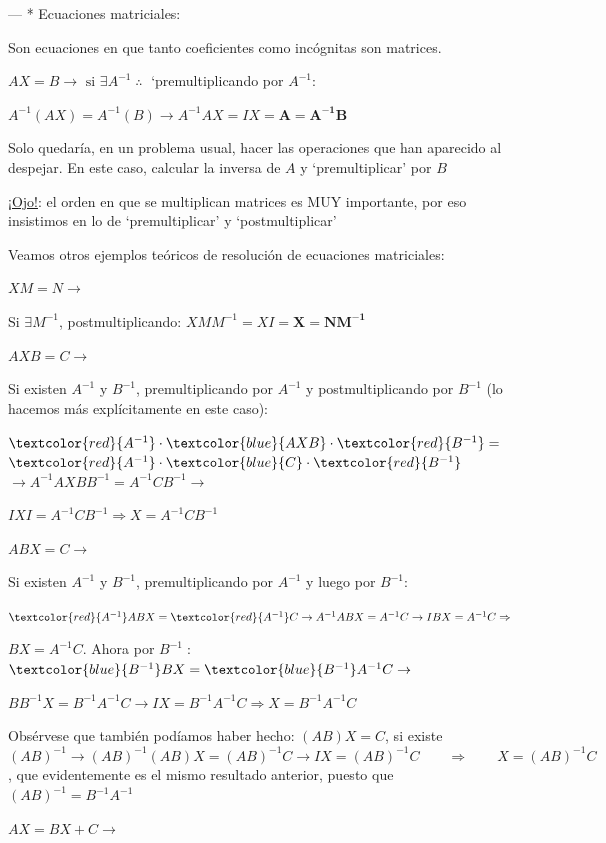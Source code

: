 --- * Ecuaciones matriciales: 

Son ecuaciones en que tanto coeficientes como incógnitas son matrices.

$AX=B \to \text{ si } \exists A^{-1} \; \therefore \; $ `premultiplicando por $A^{-1}$:

$A^{-1}(AX)= A^{-1}(B) \to A^{-1}AX=IX=\boldsymbol{A=A^{-1}B}$

Solo quedaría, en un problema usual, hacer las operaciones que han aparecido al despejar. En este caso, calcular la inversa de $A$ y `premultiplicar' por $B$ 

\underline{¡Ojo!}: el orden en que se multiplican matrices es MUY importante, por eso insistimos en lo de `premultiplicar' y `postmultiplicar' 

Veamos otros ejemplos teóricos de resolución de ecuaciones matriciales:

\noindent * $XM=N \to$

Si $\exists M^{-1}$, postmultiplicando: $XMM^{-1}=XI=\boldsymbol{X=NM^{-1}}$

\noindent * $AXB=C \to $

Si existen $A^{-1}$ y $B^{-1}$, premultiplicando por $A^{-1}$ y postmultiplicando por $B^{-1}$ (lo hacemos más explícitamente en este caso):

$\textcolor{red}{A^{-1}} \cdot \textcolor{blue}{AXB}  \cdot \textcolor{red}{B^{-1}}= $
$\textcolor{red}{A^{-1}} \cdot \textcolor{blue}{C} \cdot \textcolor{red}{B^{-1}} $
$\to A^{-1}AXBB^{-1}=A^{-1}CB^{-1} \to $

$IXI=A^{-1}CB^{-1} \Rightarrow X=A^{-1}CB^{-1}$

\noindent * $ABX=C \to $

Si existen $A^{-1}$ y $B^{-1}$, premultiplicando por $A^{-1}$ y luego por $B^{-1}$:

$ \textcolor{red}{A^{-1}} ABX = \textcolor{red}{A^{-1}} C \to  A^{-1}ABX=A^{-1}C\to IBX=A^{-1}C \Rightarrow$ 

$BX=A^{-1}C$. Ahora por $B^{-1}\; $: $\textcolor{blue}{B^{-1}}BX=\textcolor{blue}{B^{-1}}A^{-1}C \to $

$BB^{-1}X=B^{-1}A^{-1}C \to IX=B^{-1}A^{-1}C  \Rightarrow X=B^{-1}A^{-1}C $

Obsérvese que también podíamos haber hecho: $(AB)X=C$, si existe $(AB)^{-1} \to (AB)^{-1}(AB)X=(AB)^{-1}C \to IX=(AB)^{-1}C \qquad  \Rightarrow \qquad X=(AB)^{-1}C$, que evidentemente es el mismo resultado anterior, puesto que $(AB)^{-1}=B^{-1}A^{-1}$

\noindent * $AX=BX+C \to$ 

